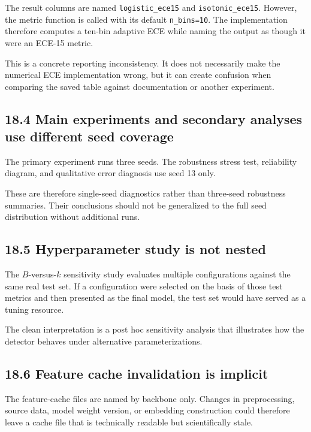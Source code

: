 \documentclass[
  11pt,
]{article}
\begin{document}
The result columns are named \texttt{logistic\_ece15} and
\texttt{isotonic\_ece15}. However, the metric function is called with
its default \texttt{n\_bins=10}. The implementation therefore computes a
ten-bin adaptive ECE while naming the output as though it were an ECE-15
metric.

This is a concrete reporting inconsistency. It does not necessarily make
the numerical ECE implementation wrong, but it can create confusion when
comparing the saved table against documentation or another experiment.

\subsection{18.4 Main experiments and secondary analyses use different
seed
coverage}\label{main-experiments-and-secondary-analyses-use-different-seed-coverage}

The primary experiment runs three seeds. The robustness stress test,
reliability diagram, and qualitative error diagnosis use seed 13 only.

These are therefore single-seed diagnostics rather than three-seed
robustness summaries. Their conclusions should not be generalized to the
full seed distribution without additional runs.

\subsection{18.5 Hyperparameter study is not
nested}\label{hyperparameter-study-is-not-nested}

The \(B\)-versus-\(k\) sensitivity study evaluates multiple
configurations against the same real test set. If a configuration were
selected on the basis of those test metrics and then presented as the
final model, the test set would have served as a tuning resource.

The clean interpretation is a post hoc sensitivity analysis that
illustrates how the detector behaves under alternative
parameterizations.

\subsection{18.6 Feature cache invalidation is
implicit}\label{feature-cache-invalidation-is-implicit}

The feature-cache files are named by backbone only. Changes in
preprocessing, source data, model weight version, or embedding
construction could therefore leave a cache file that is technically
readable but scientifically stale.
\end{document}
